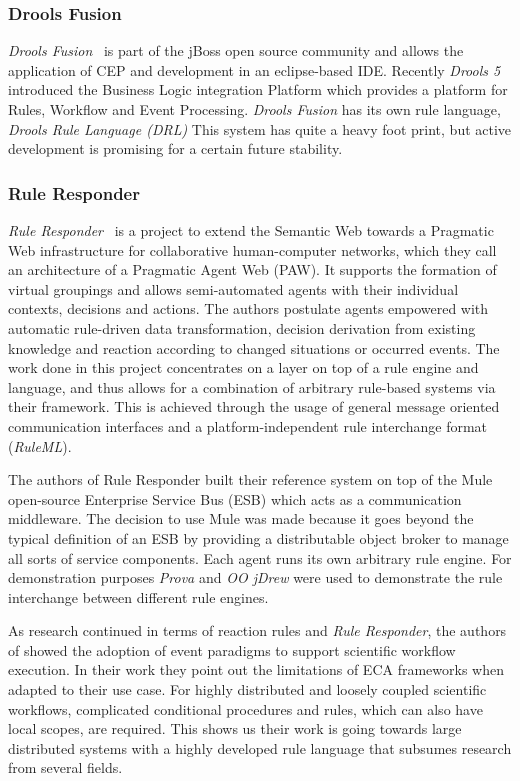 \documentclass[11pt]{article}%
\begin{document}
\subsubsection{Drools Fusion}
\emph{Drools Fusion}~\cite{wwwdrools} is part of the jBoss open source community and allows the application of CEP and development in an eclipse-based IDE. Recently \emph{Drools 5} introduced the Business Logic integration Platform which provides a platform for Rules, Workflow and Event Processing. \emph{Drools Fusion} has its own rule language, \emph{Drools Rule Language (DRL)} This system has quite a heavy foot print, but active development is promising for a certain future stability.

\subsubsection{Rule Responder}
\emph{Rule Responder}~\cite{2007-Paschke_etal-RuleResponder.pdf} is a project to extend the Semantic Web towards a Pragmatic Web infrastructure for collaborative human-computer networks, which they call an architecture of a Pragmatic Agent Web (PAW). It supports the formation of virtual groupings and allows semi-automated agents with their individual contexts, decisions and actions. The authors postulate agents empowered with automatic rule-driven data transformation, decision derivation from existing knowledge and reaction according to changed situations or occurred events. The work done in this project concentrates on a layer on top of a rule engine and language, and thus allows for a combination of arbitrary rule-based systems via their framework. This is achieved through the usage of general message oriented communication interfaces and a platform-independent rule interchange format (\emph{RuleML}).

The authors of Rule Responder built their reference system\cite{wwwruleresponder} on top of the Mule~\cite{wwwmuleesb} open-source Enterprise Service Bus (ESB) which acts as a communication middleware. The decision to use Mule was made because it goes beyond the typical definition of an ESB by providing a distributable object broker to manage all sorts of service components. Each agent runs its own arbitrary rule engine. For demonstration purposes \emph{Prova} and \emph{OO jDrew} were used to demonstrate the rule interchange between different rule engines.

As research continued in terms of reaction rules and \textit{Rule Responder}, the authors of \cite{2013_Zhao-Paschke_EDSWE.pdf} showed the adoption of event paradigms to support scientific workflow execution. In their work they point out the limitations of ECA frameworks when adapted to their use case. For highly distributed and loosely coupled scientific workflows, complicated conditional procedures and rules, which can also have local scopes, are required. This shows us their work is going towards large distributed systems with a highly developed rule language that subsumes research from several fields.
\end{document}
